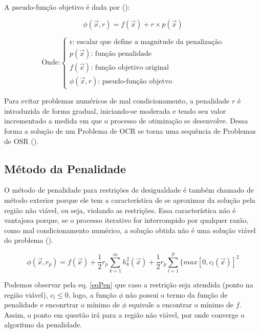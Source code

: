 \documentclass[10pt, a4paper]{article}
\begin{document}
A pseudo-fun\c c\~ao objetivo \'e dada por (\cite{ppt}):

\begin{equation}
      \phi (\vec{x}, r) = f(\vec{x}) + r \times p(\vec{x})
\end{equation}

\small
$$
\text{Onde:} \begin{cases}
      \text{r: escalar que define a magnitude da penaliza\c c\~ao}\\
      \text{$p(\vec{x})$: fun\c c\~ao penalidade}\\
      \text{$f(\vec{x})$: fun\c c\~ao objetivo original}\\
      \text{$\phi (\vec{x}, r)$: pseudo-fun\c c\~ao objetvo}
\end{cases}
$$
\normalsize

Para evitar problemas num\'ericos de mal condicionamento, a penalidade $r$ \'e introduzida de forma gradual, iniciando-se moderada e tendo seu valor incrementado a medida em que o processo de otimiza\c c\~ao se desenvolve. Dessa forma a solu\c c\~ao de um Problema de OCR se torna uma sequ\^encia de Problemas de OSR (\cite{ppt}).

\subsection{M\'etodo da Penalidade}

O m\'etodo de penalidade para restri\c c\~oes de desigualdade \'e tamb\'em chamado de m\'etodo exterior porque ele tem a caracter\'istica de se aproximar da solu\c c\~ao pela regi\~ao n\~ao vi\'avel, ou seja, violando as restri\c c\~oes. Essa caracter\'istica n\~ao \'e vantajosa porque, se o processo iterativo for interrompido por qualquer raz\~ao, como mal condicionamento num\'erico, a solu\c c\~ao obtida n\~ao \'e uma solu\c c\~ao vi\'avel do problema (\cite{apostila}).

\begin{equation} \label{eqPen}
      \phi (\vec{x}, r_p) = f(\vec{x}) + \frac{1}{2} r_p \sum_{k=1}^{m} h_k^2(\vec{x}) + \frac{1}{2} r_p \sum_{l=1}^{p} \{max[0,c_l(\vec{x})]^2
\end{equation}

Podemos observar pela eq. \ref{eqPen} que caso a restri\c c\~ao seja atendida (ponto na regi\~ao vi\'avel), $c_l \leq 0$, logo, a fun\c c\~ao $\phi$ n\~ao possui o termo da fun\c c\~ao de penalidade e enconrtrar o m\'inimo de $\phi$ equivale a encontrar o m\'inimo de $f$. Assim, o ponto em quest\~ao ir\'a para a regi\~ao n\~ao vi\'avel, por onde converge o algoritmo da penalidade.
\end{document}
